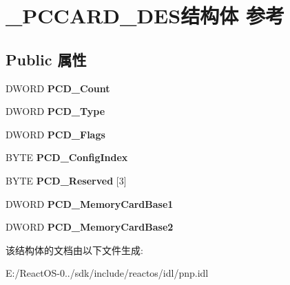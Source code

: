 \hypertarget{struct___p_c_c_a_r_d___d_e_s}{}\section{\+\_\+\+P\+C\+C\+A\+R\+D\+\_\+\+D\+E\+S结构体 参考}
\label{struct___p_c_c_a_r_d___d_e_s}
\subsection*{Public 属性}
\begin{DoxyCompactItemize}
\item 
\mbox{\label{struct___p_c_c_a_r_d___d_e_s_a18c5fb8f6338fa6764cdddf261c66a9f}} 
D\+W\+O\+RD {\bfseries P\+C\+D\+\_\+\+Count}
\item 
\mbox{\label{struct___p_c_c_a_r_d___d_e_s_a04d443b26a9d8a3a6ac447ecbdc12544}} 
D\+W\+O\+RD {\bfseries P\+C\+D\+\_\+\+Type}
\item 
\mbox{\label{struct___p_c_c_a_r_d___d_e_s_ae4f2998dcc6ed2f90cbc00bb4e19f78a}} 
D\+W\+O\+RD {\bfseries P\+C\+D\+\_\+\+Flags}
\item 
\mbox{\label{struct___p_c_c_a_r_d___d_e_s_a705c38ac48a7b7496ed8510a51c62363}} 
B\+Y\+TE {\bfseries P\+C\+D\+\_\+\+Config\+Index}
\item 
\mbox{\label{struct___p_c_c_a_r_d___d_e_s_af97a16e893cab1d51e1321c7d8a8d3b6}} 
B\+Y\+TE {\bfseries P\+C\+D\+\_\+\+Reserved} \mbox{[}3\mbox{]}
\item 
\mbox{\label{struct___p_c_c_a_r_d___d_e_s_a179a999d46e981ce788685f14f5e4477}} 
D\+W\+O\+RD {\bfseries P\+C\+D\+\_\+\+Memory\+Card\+Base1}
\item 
\mbox{\label{struct___p_c_c_a_r_d___d_e_s_ad50b2bfebb781484aa6b49e76663d8b9}} 
D\+W\+O\+RD {\bfseries P\+C\+D\+\_\+\+Memory\+Card\+Base2}
\end{DoxyCompactItemize}


该结构体的文档由以下文件生成\+:\begin{DoxyCompactItemize}
\item 
E\+:/\+React\+O\+S-\/0../sdk/include/reactos/idl/pnp.\+idl\end{DoxyCompactItemize}
